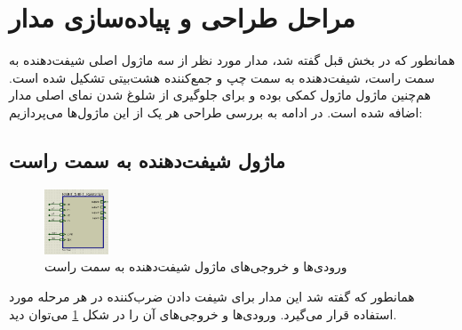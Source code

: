 \documentclass[12pt,onecolumn,a4paper,fleqn]{article}
\begin{document}
	\section{مراحل طراحی و پیاده‌سازی مدار}
	همانطور که در بخش قبل گفته شد، مدار مورد نظر از سه ماژول اصلی شیفت‌دهنده به سمت راست، شیفت‌دهنده به سمت چپ و جمع‌کننده هشت‌بیتی تشکیل شده است. هم‌چنین ماژول  ماژول کمکی بوده و برای جلوگیری از شلوغ شدن نمای اصلی مدار اضافه شده است. در ادامه به بررسی طراحی هر یک از این ماژول‌ها می‌پردازیم:
	\subsection{ماژول شیفت‌دهنده به سمت راست}
	\begin{figure}
		\centering
		\includegraphics[width=0.17\textwidth]{source/rshiftreg.png}
		\caption{ورودی‌ها و خروجی‌های ماژول شیفت‌دهنده به سمت راست}
		\label{fig:rshiftreg}
	\end{figure}
همانطور که گفته شد این مدار برای شیفت دادن ضرب‌کننده در هر مرحله مورد استفاده قرار می‌گیرد. ورودی‌ها و خروجی‌های آن را در شکل \ref{fig:rshiftreg} می‌توان دید.
\end{document}
